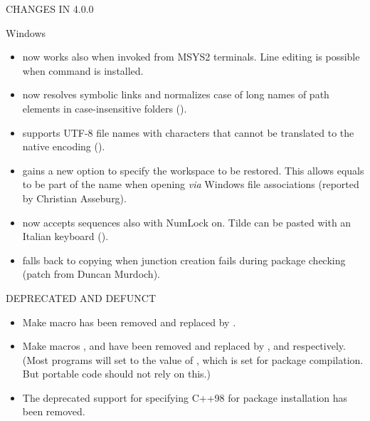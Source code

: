 \documentclass[letterpaper]{book}
\begin{document}
\begin{Section}{ CHANGES IN 4.0.0}
\begin{SubSection}{Windows}
\begin{itemize}
\item{}  now works also when invoked from MSYS2
terminals.  Line editing is possible when command  is
installed.

\item{}  now resolves symbolic links and
normalizes case of long names of path elements in case-insensitive
folders ().

\item{}  supports UTF-8 file names with characters
that cannot be translated to the native encoding ().

\item{}  gains a new option  to
specify the workspace to be restored.  This allows equals to be
part of the name when opening \emph{via} Windows file associations
(reported by Christian Asseburg).

\item{}  now accepts  sequences also
with NumLock on.  Tilde can be pasted with an Italian keyboard
().

\item{} \R{} falls back to copying when junction creation fails during
package checking (patch from Duncan Murdoch).

\end{itemize}


\end{SubSection}


%
\begin{SubSection}{DEPRECATED AND DEFUNCT}
\begin{itemize}

\item{} Make macro  has been removed
and replaced by .

\item{} Make macros ,  and
 have been removed and replaced by
,  and 
respectively.  (Most  programs will set 
to the value of , which is set for package compilation.
But portable code should not rely on this.)

\item{} The deprecated support for specifying C++98 for package
installation has been removed.


\end{itemize}
\end{SubSection}
\end{Section}
\end{document}
